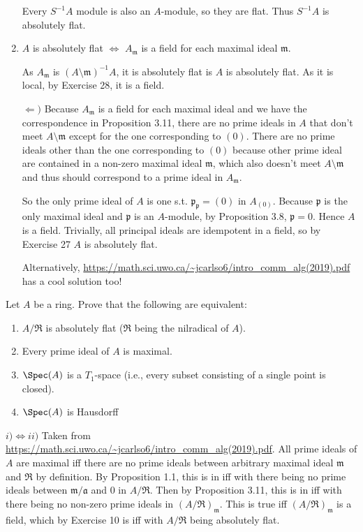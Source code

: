 \begin{questions}
\begin{enumerate}
	\begin{solution}
		Every $S^{-1}A $ module is also an $A $-module, so they are flat.
		Thus $S^{-1}A $ is absolutely flat.
	\end{solution}
	\item $A $ is absolutely flat $\iff $ $A_ \mathfrak{m}$ is a field for each maximal ideal $\mathfrak{m} $.
	\begin{solution}
		As $A_ \mathfrak{m} $ is $(A \setminus \mathfrak{m})^{-1}A $, it is absolutely flat is $A $ is absolutely flat.
		As it is local, by Exercise 28, it is a field.

		$\Leftarrow) $ Because $A_{ \mathfrak{m}} $ is a field for each maximal ideal and we have the correspondence in Proposition 3.11, there are no prime ideals in $A $ that don't meet $A \setminus \mathfrak{m} $ except for the one corresponding to $(0) $.
		There are no prime ideals other than the one corresponding to $(0) $ because other prime ideal are contained in a non-zero maximal ideal $\mathfrak{m} $, which also doesn't meet $A\setminus \mathfrak{m} $ and thus should correspond to a prime ideal in $A_{\mathfrak{m}} $.

		So the only prime ideal of $A $ is one s.t. $\mathfrak{p}_{\mathfrak{p}} = (0) $ in $A_{(0)} $.
		Because $\mathfrak{p} $ is the only maximal ideal and $\mathfrak{p} $ is an $A $-module, by Proposition 3.8, $\mathfrak{p} = 0 $.
		Hence $A $ is a field.
		Trivially, all principal ideals are idempotent in a field, so by Exercise 27 $A $ is absolutely flat.

		Alternatively, \url{https://math.sci.uwo.ca/~jcarlso6/intro_comm_alg(2019).pdf} has a cool solution too!
	\end{solution}
\end{enumerate}
\question Let $A $ be a ring. Prove that the following are equivalent:
\begin{enumerate}
	\item $A / \mathfrak{R} $ is absolutely flat ($\mathfrak{R} $ being the nilradical of $A $).
	\item Every prime ideal of $A $ is maximal.
	\item $\Spec(A) $ is a $T_{1} $-space (i.e., every subset consisting of a single point is closed).
	\item $\Spec(A) $ is Hausdorff
\end{enumerate}
\begin{solution}
	$i)\iff ii) $ 
	Taken from \url{https://math.sci.uwo.ca/~jcarlso6/intro_comm_alg(2019).pdf}.
	All prime ideals of $A $ are maximal iff there are no prime ideals between arbitrary maximal ideal $\mathfrak{m} $ and $\mathfrak{R} $ by definition.
	By Proposition 1.1, this is in iff with there being no prime ideals between $\mathfrak{m} / \mathfrak{a} $ and $0 $ in $A / \mathfrak{R} $.
	Then by Proposition 3.11, this is in iff with there being no non-zero prime ideals in $(A / \mathfrak{R})_{\mathfrak{m}} $.
	This is true iff $(A / \mathfrak{R})_{\mathfrak{m}} $ is a field, which by Exercise 10 is iff with $A / \mathfrak{R}$ being absolutely flat.


\end{solution}
\end{questions}
